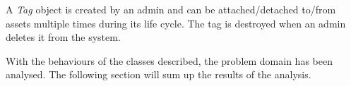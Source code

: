 A \textit{Tag} object is created by an admin and can be attached/detached to/from assets multiple times during its life cycle. The tag is destroyed when an admin deletes it from the system.
\par

With the behaviours of the classes described, the problem domain has been analysed. The following section will sum up the results of the analysis.


